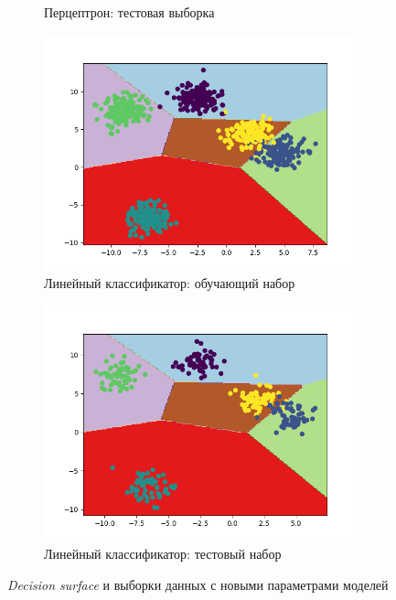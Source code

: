 \begin{figure}[h]
\begin{subfigure}{0.49\linewidth}
		\caption{Перцептрон: тестовая выборка}
	\end{subfigure}
	\begin{subfigure}{0.49\linewidth}
		\includegraphics[width=\linewidth]{images/sgd_train_blobs_last}
		\caption{Линейный классификатор: обучающий набор}
	\end{subfigure}
	\begin{subfigure}{0.49\linewidth}
		\includegraphics[width=\linewidth]{images/sgd_test_blobs_last}
		\caption{Линейный классификатор: тестовый набор}
	\end{subfigure}

	\caption{\textit{Decision surface} и выборки данных с новыми параметрами моделей}
	\label{img:blobs_last}
\end{figure}